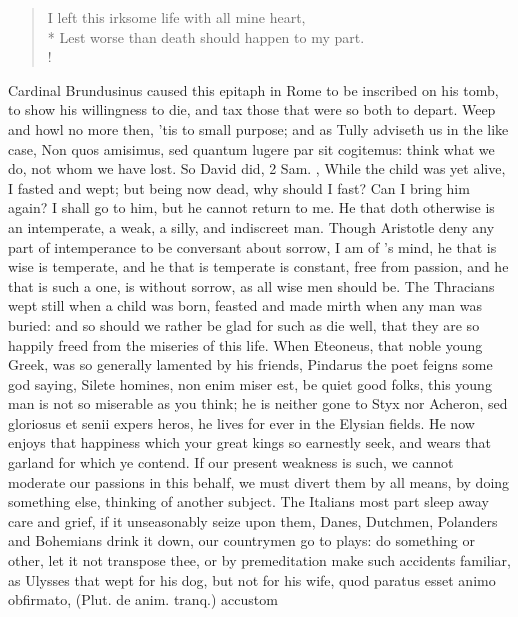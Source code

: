 {\begin{latin}
\begin{verse}
\end{verse}%
\end{latin}%
\translationrule%
\begin{verse}%
I left this irksome life with all mine heart,\\*
Lest worse than death should happen to my part.\\!
\end{verse}%
%
Cardinal Brundusinus caused this epitaph in Rome to be inscribed
on his tomb, to show his willingness to die, and tax those that were so
both to depart. Weep and howl no more then, 'tis to small purpose; and
as Tully adviseth us in the like case, Non quos amisimus, sed quantum
lugere par sit cogitemus: think what we do, not whom we have lost. So
David did, 2 Sam. , While the child was yet alive, I fasted and
wept; but being now dead, why should I fast? Can I bring him again? I
shall go to him, but he cannot return to me. He that doth otherwise is
an intemperate, a weak, a silly, and indiscreet man. Though Aristotle
deny any part of intemperance to be conversant about sorrow, I am of
\Seneca's mind, he that is wise is temperate, and he that is
temperate is constant, free from passion, and he that is such a one, is
without sorrow, as all wise men should be. The Thracians wept
still when a child was born, feasted and made mirth when any man was
buried: and so should we rather be glad for such as die well, that they
are so happily freed from the miseries of this life. When Eteoneus,
that noble young Greek, was so generally lamented by his friends,
Pindarus the poet feigns some god saying, Silete homines, non enim
miser est, \etc{} be quiet good folks, this young man is not so miserable
as you think; he is neither gone to Styx nor Acheron, sed gloriosus et
senii expers heros, he lives for ever in the Elysian fields. He now
enjoys that happiness which your great kings so earnestly seek, and
wears that garland for which ye contend. If our present weakness is
such, we cannot moderate our passions in this behalf, we must divert
them by all means, by doing something else, thinking of another
subject. The Italians most part sleep away care and grief, if it
unseasonably seize upon them, Danes, Dutchmen, Polanders and Bohemians
drink it down, our countrymen go to plays: do something or other, let
it not transpose thee, or by  premeditation make such accidents
familiar, as Ulysses that wept for his dog, but not for his wife, quod
paratus esset animo obfirmato, (Plut. de anim. tranq.) accustom
}

